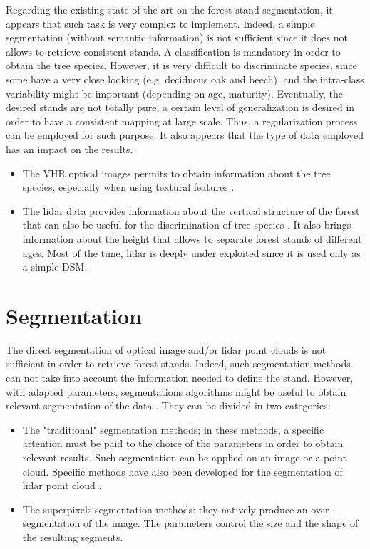 Regarding the existing state of the art on the forest stand segmentation, it appears that such task is very complex to implement. Indeed, a simple segmentation (without semantic information) is not sufficient since it does not allows to retrieve consistent stands. A classification is mandatory in order to obtain the tree species. However, it is very difficult to discriminate species, since some have a very close looking (e.g. deciduous oak and beech), and the intra-class variability might be important (depending on age, maturity). Eventually, the desired stands are not totally pure, a certain level of generalization is desired in order to have a consistent mapping at large scale. Thus, a regularization process can be employed for such purpose.
It also appears that the type of data employed has an impact on the results.
\begin{itemize}
\item The VHR optical images permits to obtain information about the tree species, especially when using textural features \citep{franklin2000incorporating}.
\item The lidar data provides information about the vertical structure of the forest that can also be useful for the discrimination of tree species \citep{brandtberg2007classifying}. It also brings information about the height that allows to separate forest stands of different ages. Most of the time, lidar is deeply under exploited since it is used only as a simple DSM.
\end{itemize}

\section{Segmentation}
\label{sec:C1_seg}
The direct segmentation of optical image and/or lidar point clouds is not sufficient in order to retrieve forest stands. Indeed, such segmentation methods can not take into account the information needed to define the stand.  However, with adapted parameters, segmentations algorithms might be useful to obtain relevant segmentation of the data \citep{clement_IJPRS}. They can be divided in two categories:
\begin{itemize}
\item The "traditional" segmentation methods; in these methods, a specific attention must be paid to the choice of the parameters in order to obtain relevant results. Such segmentation can be applied on an image or a point cloud. Specific methods have also been developed for the segmentation of lidar point cloud \citep{nguyen20133d}.
\item The superpixels segmentation methods: they natively produce an over-segmentation of the image. The parameters control the size and the shape of the resulting segments.
\end{itemize}

